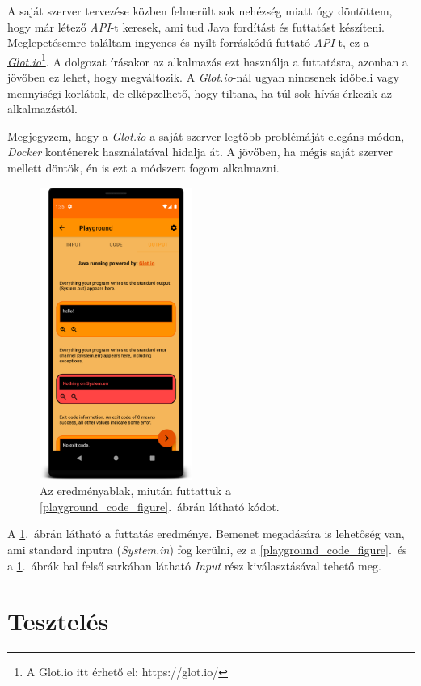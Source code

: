 \documentclass[12pt,a4paper]{article}
\begin{document}
	A saját szerver tervezése közben felmerült sok nehézség miatt úgy döntöttem, hogy már létező \textit{API}-t keresek, ami tud Java fordítást és futtatást készíteni.
	Meglepetésemre találtam ingyenes és nyílt forráskódú futtató \textit{API}-t, ez a \href{https://glot.io/}{\textit{Glot.io}}\footnote{A Glot.io itt érhető el: https://glot.io/}. A dolgozat írásakor az alkalmazás ezt használja a futtatásra, azonban a jövőben ez lehet, hogy megváltozik. A \textit{Glot.io}-nál ugyan nincsenek időbeli vagy mennyiségi korlátok, de elképzelhető, hogy tiltana, ha túl sok hívás érkezik az alkalmazástól.
	
	Megjegyzem, hogy a \textit{Glot.io} a saját szerver legtöbb problémáját elegáns módon, \textit{Docker} konténerek használatával hidalja át. A jövőben, ha mégis saját szerver mellett döntök, én is ezt a módszert fogom alkalmazni.

	\begin{figure}[h!]
		\centering
		\includegraphics[width=5cm]{playground_output}
		\caption{Az eredményablak, miután futtattuk a \ref{playground_code_figure}.\ ábrán látható kódot.}
		\label{playground_output_figure}
	\end{figure}

	A \ref{playground_output_figure}.\ ábrán látható a futtatás eredménye. Bemenet megadására is lehetőség van, ami standard inputra (\textit{System.in}) fog kerülni, ez a \ref{playground_code_figure}.\ és a \ref{playground_output_figure}.\ ábrák bal felső sarkában látható \textit{Input} rész kiválasztásával tehető meg.

	\section{Tesztelés}
\end{document}
